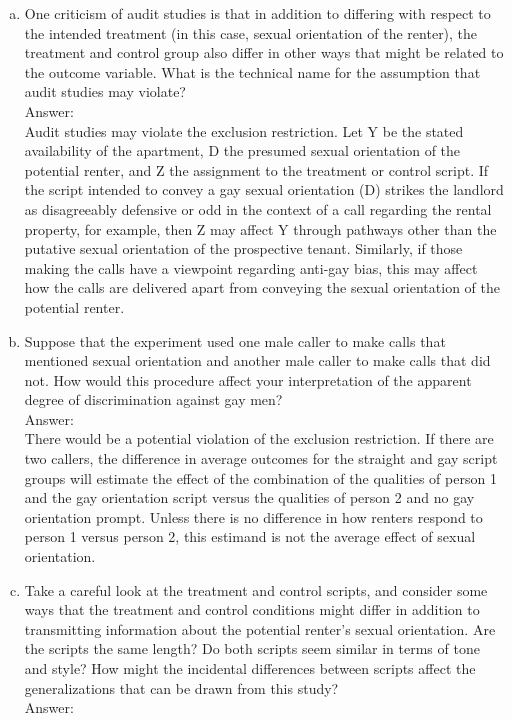 \documentclass[11pt,notitlepage]{article}\usepackage[]{graphicx}\usepackage[]{color}
\begin{document}
\begin{enumerate}[a)]
\item One criticism of audit studies is that in addition to differing with respect to the intended treatment (in this case, sexual orientation of the renter), the treatment and control group also differ in other ways that might be related to the outcome variable. What is the technical name for the assumption that audit studies may violate?\\
Answer:\\
Audit studies may violate the exclusion restriction. Let Y be the stated availability of the apartment, D the presumed sexual orientation of the potential renter, and Z the assignment to the treatment or control script. If the script intended to convey a gay sexual orientation (D) strikes the landlord as disagreeably defensive or odd in the context of a call regarding the rental property, for example, then Z may affect Y through pathways other than the putative sexual orientation of the prospective tenant. Similarly, if those making the calls have a viewpoint regarding anti-gay bias, this may affect how the calls are delivered apart from conveying the sexual orientation of the potential renter.

\item Suppose that the experiment used one male caller to make calls that mentioned sexual orientation and another male caller to make calls that did not. How would this procedure affect your interpretation of the apparent degree of discrimination against gay men?\\
Answer:\\
There would be a potential violation of the exclusion restriction. If there are two callers, the difference in average outcomes for the straight and gay script groups will estimate the effect of the combination of the qualities of person 1 and the gay orientation script versus the qualities of person 2 and no gay orientation prompt. Unless there is no difference in how renters respond to person 1 versus person 2, this estimand is not the average effect of sexual orientation. 

\item Take a careful look at the treatment and control scripts, and consider some ways that the treatment and control conditions might differ in addition to transmitting information about the potential renter's sexual orientation. Are the scripts the same length? Do both scripts seem similar in terms of tone and style? How might the incidental differences between scripts affect the generalizations that can be drawn from this study?\\
Answer:\\


\end{enumerate}
\end{document}
